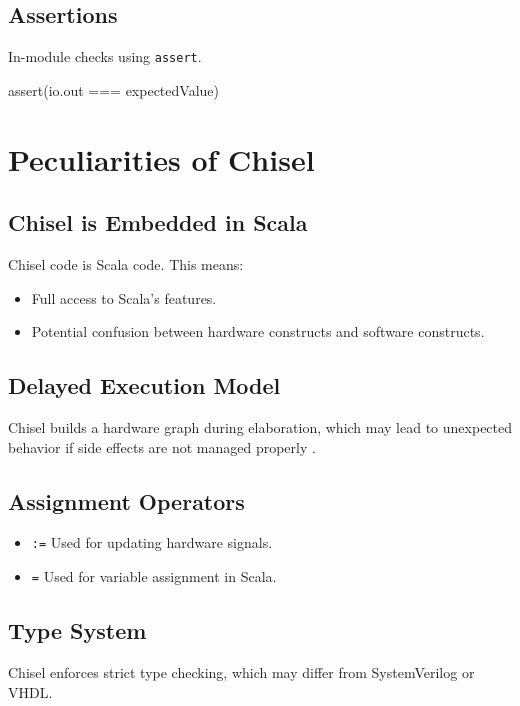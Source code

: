 \subsection{Assertions}
In-module checks using \texttt{assert}.
\begin{chiselcode}
assert(io.out === expectedValue)
\end{chiselcode}

\section{Peculiarities of Chisel}
\subsection{Chisel is Embedded in Scala}
Chisel code is Scala code. This means:

\begin{itemize}
    \item Full access to Scala's features.
    \item Potential confusion between hardware constructs and software constructs.
\end{itemize}

\subsection{Delayed Execution Model}
Chisel builds a hardware graph during elaboration, which may lead to unexpected behavior if side effects are not managed properly \cite{chisel-doc}.

\subsection{Assignment Operators}
\begin{itemize}
    \item \texttt{:=} Used for updating hardware signals.
    \item \texttt{=} Used for variable assignment in Scala.
\end{itemize}

\subsection{Type System}
Chisel enforces strict type checking, which may differ from SystemVerilog or VHDL.

